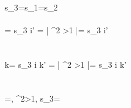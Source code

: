 \\
s_3=s_1=s_2
\\\\
{\omega}= s_3  i\omega' = \left | \beta^2 \textgreater 1 \right |= s_3 \frac {\beta}{\left | \beta \right |} \sqrt {}i\omega'
\\
\\
\\
{k}= s_3  i k' = \left | \beta^2 \textgreater 1 \right |= s_3 \frac {\beta}{\left | \beta \right |}\sqrt {}i k'
\\
\\
\\
\beta=, \beta^2\textgreater 1, s_3= 
